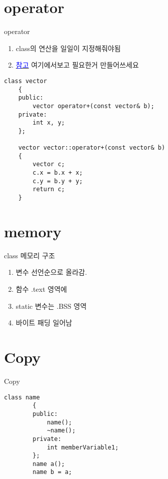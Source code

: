 \documentclass[10pt]{beamer}
\begin{document}
\section{operator}


\begin{frame}[fragile]{operator}
    \begin{enumerate}
        \item class의 연산을 일일이 지정해줘야됨
        \item \href{https://en.wikipedia.org/wiki/Operators_in_C_and_C%2B%2B}{\textcolor{blue}{참고}}
        여기에서보고 필요한거 만들어쓰세요
        

    \end{enumerate}


    \begin{lstlisting}[style = CStyle]
    class vector
    {
    public:
        vector operator+(const vector& b);
    private:
        int x, y;
    };

    vector vector::operator+(const vector& b)
    {
        vector c;
        c.x = b.x + x;
        c.y = b.y + y;
        return c;
    }
    \end{lstlisting}
    
\end{frame}    


\section{memory}

\begin{frame}{class 메모리 구조}
    \begin{enumerate}
        \item 변수 선언순으로 올라감.
        \item 함수 .text 영역에
        \item static 변수는 .BSS 영역
        \item 바이트 패딩 일어남
    \end{enumerate}
\end{frame}    


\section{Copy}

\begin{frame}[fragile]{Copy}
    \begin{lstlisting}[style = CStyle]
        class name
        {
        public:
            name();
            ~name();
        private:
            int memberVariable1;
        };
        name a();
        name b = a; 
        \end{lstlisting}
\end{frame}    
\end{document}

